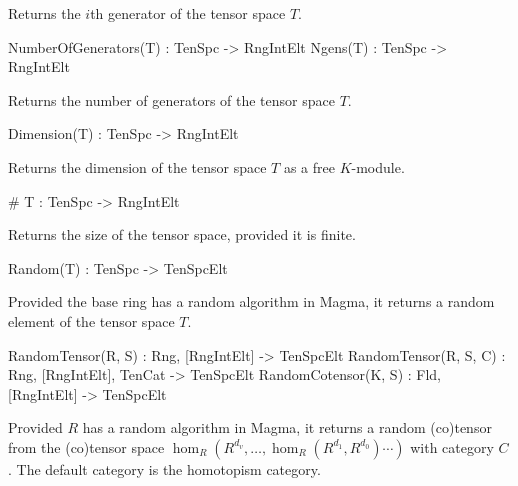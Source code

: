 Returns the $i$th generator of the tensor space $T$.

\begin{intrinsics}
NumberOfGenerators(T) : TenSpc -> RngIntElt
Ngens(T) : TenSpc -> RngIntElt
\end{intrinsics}

Returns the number of generators of the tensor space $T$.

\begin{intrinsics}
Dimension(T) : TenSpc -> RngIntElt
\end{intrinsics}

Returns the dimension of the tensor space $T$ as a free $K$-module.

\index{\#}
\begin{intrinsics}
# T : TenSpc -> RngIntElt
\end{intrinsics}

Returns the size of the tensor space, provided it is finite.

\begin{intrinsics}
Random(T) : TenSpc -> TenSpcElt
\end{intrinsics}

Provided the base ring has a random algorithm in Magma, it returns a random 
element of the tensor space $T$.

\begin{intrinsics}
RandomTensor(R, S) : Rng, [RngIntElt] -> TenSpcElt
RandomTensor(R, S, C) : Rng, [RngIntElt], TenCat -> TenSpcElt
RandomCotensor(K, S) : Fld, [RngIntElt] -> TenSpcElt
\end{intrinsics}

Provided $R$ has a random algorithm in Magma, it returns a random (co)tensor from 
the (co)tensor space $\hom_R(R^{d_v},\dots,\hom_R(R^{d_1},R^{d_0})\cdots )$ with category $C$.
The default category is the homotopism category.

